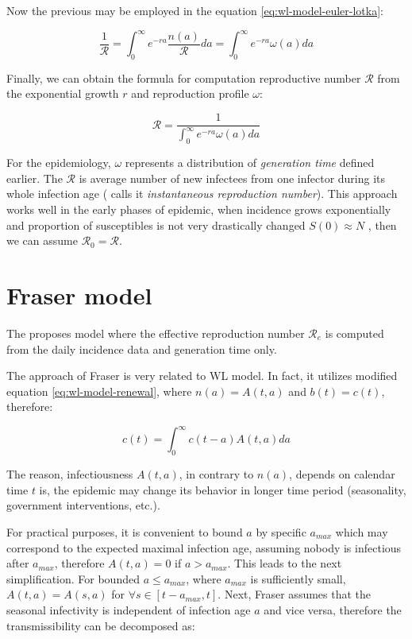 \documentclass[
  digital, %
  oneside, %
  lof,     %
  lot,     %
]{fithesis4}
\begin{document}
Now the previous may be employed in the equation \eqref{eq:wl-model-euler-lotka}:

\begin{equation}\label{eq:wl-model-euler-lotka-R}
  \frac{1}{\mathcal{R}} = \int_{0}^{\infty} e^{-ra} \frac{n(a)}{\mathcal{R}} da = \int_{0}^{\infty} e^{-ra} \omega(a) da
\end{equation}

Finally, we can obtain the formula for computation reproductive number
$\mathcal{R}$ from the exponential growth $r$ and reproduction profile $\omega$:

\begin{equation}\label{eq:wl-model-euler-lotka-R-final}
  \mathcal{R} = \frac{1}{\int_{0}^{\infty} e^{-ra} \omega(a) da}
\end{equation}

For the epidemiology, $\omega$ represents
a distribution of \textit{generation time} defined earlier.
The $\mathcal{R}$ is average number of new infectees from one infector
during its whole infection age (\cite{fraser2007} 
calls it \textit{instantaneous reproduction number}).
This approach works well in the early phases of epidemic,
when incidence grows exponentially
and proportion of susceptibles is not very drastically
changed $S(0) \approx N$ \cite{park2021}, then we can assume 
$\mathcal{R}_0 = \mathcal{R}$.


\section{Fraser model}
\label{sec:fraser-model}

The \cite{fraser2007} proposes model where the effective 
reproduction number $\mathcal{R}_e$ is computed from the 
daily incidence data and generation time only.

The approach of Fraser is very related to WL
model. In fact, it utilizes modified equation
\eqref{eq:wl-model-renewal}, where 
$n(a) = A(t, a)$ and $b(t) = c(t)$, therefore:

\begin{equation}
  c( t ) = \int^{\infty}_0 c ( t - a ) A ( t, a ) da
\end{equation}

The reason, infectiousness $A(t, a)$, in contrary to $n(a)$, 
depends on calendar time $t$ is, 
the epidemic may change its behavior in longer time period
(seasonality, government interventions, etc.).

For practical purposes, it is convenient to bound $a$ 
by specific $a_{max}$ which may correspond to the expected
maximal infection age, assuming nobody is infectious after 
$a_{max}$, therefore $A(t, a) = 0$ if $a > a_{max}$.
This leads to the next simplification.
For bounded $a \leq a_{max}$, where $a_{max}$ is 
sufficiently small, $A(t, a) = A(s, a)$ for 
$\forall s \in \left[ t - a_{max}, t \right]$.
Next, Fraser assumes that the seasonal infectivity is 
independent of infection age $a$ and vice versa, therefore
the transmissibility can be decomposed as:
\end{document}
